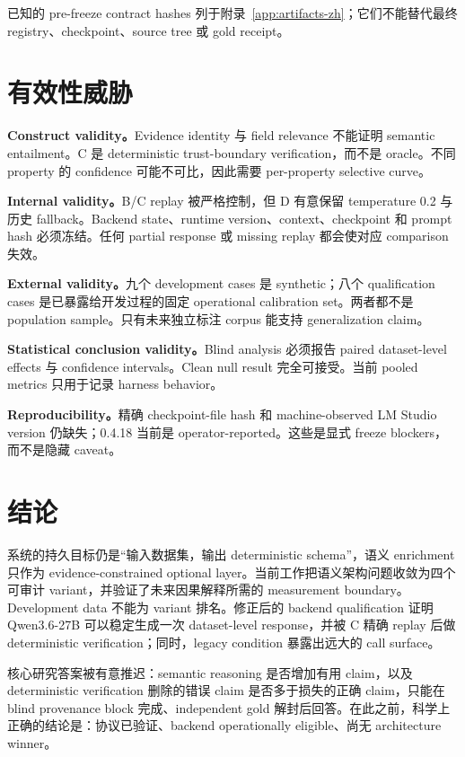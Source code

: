 \documentclass[UTF8,fontset=fandol,11pt]{ctexart}
\begin{document}
已知的 pre-freeze contract hashes 列于附录~\ref{app:artifacts-zh}；它们不能替代最终 registry、checkpoint、source tree 或 gold receipt。

\section{有效性威胁}

\textbf{Construct validity。}Evidence identity 与 field relevance 不能证明 semantic entailment。C 是 deterministic trust-boundary verification，而不是 oracle。不同 property 的 confidence 可能不可比，因此需要 per-property selective curve。

\textbf{Internal validity。}B/C replay 被严格控制，但 D 有意保留 temperature 0.2 与历史 fallback。Backend state、runtime version、context、checkpoint 和 prompt hash 必须冻结。任何 partial response 或 missing replay 都会使对应 comparison 失效。

\textbf{External validity。}九个 development cases 是 synthetic；八个 qualification cases 是已暴露给开发过程的固定 operational calibration set。两者都不是 population sample。只有未来独立标注 corpus 能支持 generalization claim。

\textbf{Statistical conclusion validity。}Blind analysis 必须报告 paired dataset-level effects 与 confidence intervals。Clean null result 完全可接受。当前 pooled metrics 只用于记录 harness behavior。

\textbf{Reproducibility。}精确 checkpoint-file hash 和 machine-observed LM Studio version 仍缺失；0.4.18 当前是 operator-reported。这些是显式 freeze blockers，而不是隐藏 caveat。

\section{结论}

系统的持久目标仍是“输入数据集，输出 deterministic schema”，语义 enrichment 只作为 evidence-constrained optional layer。当前工作把语义架构问题收敛为四个可审计 variant，并验证了未来因果解释所需的 measurement boundary。Development data 不能为 variant 排名。修正后的 backend qualification 证明 Qwen3.6-27B 可以稳定生成一次 dataset-level response，并被 C 精确 replay 后做 deterministic verification；同时，legacy condition 暴露出远大的 call surface。

核心研究答案被有意推迟：semantic reasoning 是否增加有用 claim，以及 deterministic verification 删除的错误 claim 是否多于损失的正确 claim，只能在 blind provenance block 完成、independent gold 解封后回答。在此之前，科学上正确的结论是：协议已验证、backend operationally eligible、尚无 architecture winner。
\end{document}

